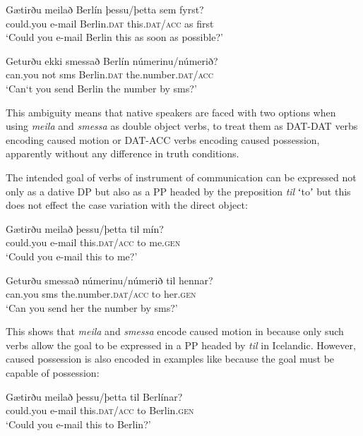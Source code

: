 \documentclass[output=paper,modfonts,nonflat,colorlinks,citecolor=brown]{langsci/langscibook}
\begin{document}
\ea%
    \label{ex:jonsson:11}
\ea
\gll  *Gætirðu  meilað  Berlín  þessu/þetta  sem  fyrst?\\
   could.you  e-mail  Berlin.\textsc{dat}  this.\textsc{dat/acc}  as  first\\
\glt `Could you e-mail Berlin this as soon as possible?'

\ex
\gll   *Geturðu  ekki  smessað  Berlín  númerinu/númerið?\\
 can.you  not  sms  Berlin.\textsc{dat}  the.number.\textsc{dat/acc}\\
\glt `Can‘t you send Berlin the number by sms?'
\z
\z

This ambiguity means that native speakers are faced with two options when using \textit{meila} and \textit{smessa} as double object verbs, to treat them as DAT-DAT verbs encoding caused motion or DAT-ACC verbs encoding caused possession, apparently without any difference in truth conditions.

The intended goal of verbs of instrument of communication can be expressed not only as a dative DP but also as a PP headed by the preposition \textit{til} ʻtoʼ \citep[128--132]{Barðdal2008} but this does not effect the case variation with the direct object:


\ea%
    \label{ex:jonsson:12}
\ea
\gll  Gætirðu  meilað  þessu/þetta  til  mín?\\
   could.you  e-mail  this.\textsc{dat/acc}  to  me.\textsc{gen}\\
\glt `Could you e-mail this to me?'

\ex
\gll   Geturðu  smessað  númerinu/númerið  til  hennar?\\
 can.you  sms  the.number.\textsc{dat/acc}  to  her.\textsc{gen}\\
\glt `Can you send her the number by sms?'
\z
\z

This shows that \textit{meila} and \textit{smessa} encode caused motion in  because only such verbs allow the goal to be expressed in a PP headed by \textit{til} in Icelandic. However, caused possession is also encoded in examples like  because the goal must be capable of possession:


\ea%
    \label{ex:jonsson:13}
\ea
\gll  *Gætirðu  meilað  þessu/þetta  til  Berlínar?\\
   could.you  e-mail  this.\textsc{dat/acc}  to  Berlin.\textsc{gen}\\
\glt `Could you e-mail this to Berlin?'
\end{document}
